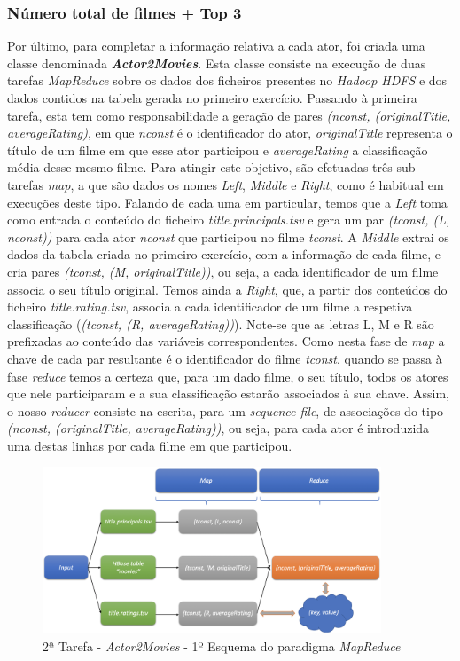 \documentclass[a4paper]{report}
\begin{document}
{		\subsubsection{Número total de filmes + Top 3} \label{sssec:Task2-3-2}
		Por último, para completar a informação relativa a cada ator, foi criada uma classe denominada \textbf{\textit{Actor2Movies}}. Esta classe consiste na execução de duas tarefas \textit{MapReduce} sobre os dados dos ficheiros presentes no \textit{Hadoop HDFS} e dos dados contidos na tabela gerada no primeiro exercício.
		Passando à primeira tarefa, esta tem como responsabilidade a geração de pares \textit{(nconst, (originalTitle, averageRating)}, em que \textit{nconst} é o identificador do ator, \textit{originalTitle} representa o título de um filme em que esse ator participou e \textit{averageRating} a classificação média desse mesmo filme.
		Para atingir este objetivo, são efetuadas três sub-tarefas \textit{map}, a que são dados os nomes \textit{Left}, \textit{Middle} e \textit{Right}, como é habitual em execuções deste tipo. Falando de cada uma em particular, temos que a \textit{Left} toma como entrada o conteúdo do ficheiro \textit{title.principals.tsv} e gera um par \textit{(tconst, (L, nconst))} para cada ator \textit{nconst} que participou no filme \textit{tconst}. A \textit{Middle} extrai os dados da tabela criada no primeiro exercício, com a informação de cada filme, e cria pares \textit{(tconst, (M, originalTitle))}, ou seja, a cada identificador de um filme associa o seu título original. Temos ainda a \textit{Right}, que, a partir dos conteúdos do ficheiro \textit{title.rating.tsv}, associa a cada identificador de um filme a respetiva classificação (\textit{(tconst, (R, averageRating))}). Note-se que as letras L, M e R são prefixadas ao conteúdo das variáveis correspondentes.
		Como nesta fase de \textit{map} a chave de cada par resultante é o identificador do filme \textit{tconst}, quando se passa à fase \textit{reduce} temos a certeza que, para um dado filme, o seu título, todos os atores que nele participaram e a sua classificação estarão associados à sua chave. Assim, o nosso \textit{reducer} consiste na escrita, para um \textit{sequence file}, de associações do tipo \textit{(nconst, (originalTitle, averageRating))}, ou seja, para cada ator é introduzida uma destas linhas por cada filme em que participou.
		\begin{figure}[H]
			\centering
			\includegraphics[width=0.9\textwidth]{Imagens/2ª Tarefa - Actor2Movies - 1º Esquema MapReduce.png}
			\caption{2ª Tarefa - \textit{Actor2Movies} - 1º Esquema do paradigma \textit{MapReduce}}
			\label{fig:19}
		\end{figure}
		
}
\end{document}
